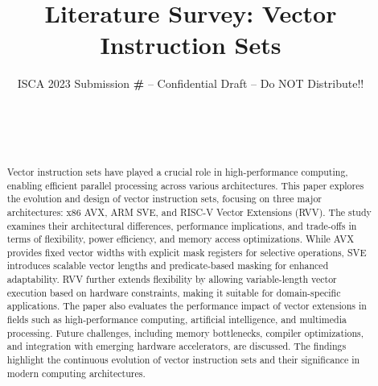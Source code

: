 \documentclass[conference]{IEEEtran}
\title{Literature Survey: Vector Instruction Sets
}
\author{\normalsize{ISCA 2023 Submission
    \textbf{\#\iscasubmissionnumber} -- Confidential Draft -- Do NOT Distribute!!}}
\begin{document}
\author{
\\

\and

\\
}


\maketitle
\thispagestyle{plain}
\pagestyle{plain}




\begin{abstract}

Vector instruction sets have played a crucial role in high-performance computing, enabling efficient parallel processing across various architectures. 
This paper explores the evolution and design of vector instruction sets, focusing on three major architectures: x86 AVX, ARM SVE, and RISC-V Vector Extensions (RVV). 
The study examines their architectural differences, performance implications, and trade-offs in terms of flexibility, power efficiency, and memory access optimizations. 
While AVX provides fixed vector widths with explicit mask registers for selective operations, SVE introduces scalable vector lengths and predicate-based masking for enhanced adaptability. 
RVV further extends flexibility by allowing variable-length vector execution based on hardware constraints, making it suitable for domain-specific applications. 
The paper also evaluates the performance impact of vector extensions in fields such as high-performance computing, artificial intelligence, and multimedia processing. 
Future challenges, including memory bottlenecks, compiler optimizations, and integration with emerging hardware accelerators, are discussed. 
The findings highlight the continuous evolution of vector instruction sets and their significance in modern computing architectures.

\end{abstract}
\end{document}
